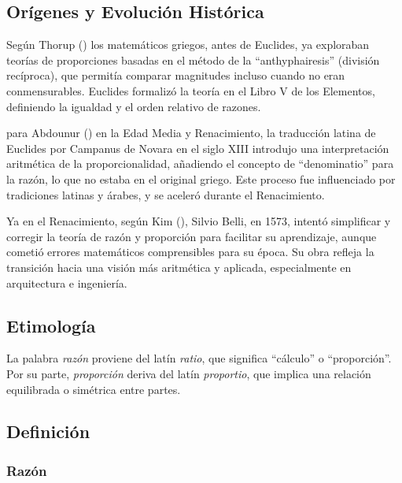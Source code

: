 \documentclass[
  stu,
  floatsintext,
  longtable,
  a4paper,
  nolmodern,
  notxfonts,
  notimes,
  colorlinks=true,linkcolor=blue,citecolor=blue,urlcolor=blue]{apa7}
\begin{document}
\subsection{Orígenes y Evolución
Histórica}\label{oruxedgenes-y-evoluciuxf3n-histuxf3rica}

Según Thorup
() los
matemáticos griegos, antes de Euclides, ya exploraban teorías de
proporciones basadas en el método de la ``anthyphairesis'' (división
recíproca), que permitía comparar magnitudes incluso cuando no eran
conmensurables. Euclides formalizó la teoría en el Libro V de los
Elementos, definiendo la igualdad y el orden relativo de razones.

para Abdounur
() en la Edad
Media y Renacimiento, la traducción latina de Euclides por Campanus de
Novara en el siglo XIII introdujo una interpretación aritmética de la
proporcionalidad, añadiendo el concepto de ``denominatio'' para la
razón, lo que no estaba en el original griego. Este proceso fue
influenciado por tradiciones latinas y árabes, y se aceleró durante el
Renacimiento.

Ya en el Renacimiento, según Kim
(), Silvio Belli, en 1573,
intentó simplificar y corregir la teoría de razón y proporción para
facilitar su aprendizaje, aunque cometió errores matemáticos
comprensibles para su época. Su obra refleja la transición hacia una
visión más aritmética y aplicada, especialmente en arquitectura e
ingeniería.

\subsection{Etimología}\label{etimologuxeda}

La palabra \emph{razón} proviene del latín \emph{ratio}, que significa
``cálculo'' o ``proporción''. Por su parte, \emph{proporción} deriva del
latín \emph{proportio}, que implica una relación equilibrada o simétrica
entre partes.

\subsection{Definición}\label{definiciuxf3n}

\subsubsection{Razón}\label{razuxf3n}
\end{document}
